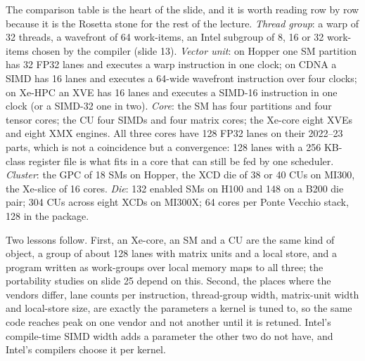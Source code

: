 \documentclass[11pt,letterpaper]{article}
\begin{document}
The comparison table is the heart of the slide, and it is worth reading row by row because it is the Rosetta stone for the rest of the lecture. \emph{Thread group}: a warp of 32 threads, a wavefront of 64 work-items, an Intel subgroup of 8, 16 or 32 work-items chosen by the compiler (slide 13). \emph{Vector unit}: on Hopper one SM partition has 32 FP32 lanes and executes a warp instruction in one clock; on CDNA a SIMD has 16 lanes and executes a 64-wide wavefront instruction over four clocks; on Xe-HPC an XVE has 16 lanes and executes a SIMD-16 instruction in one clock (or a SIMD-32 one in two). \emph{Core}: the SM has four partitions and four tensor cores; the CU four SIMDs and four matrix cores; the Xe-core eight XVEs and eight XMX engines. All three cores have 128 FP32 lanes on their 2022--23 parts, which is not a coincidence but a convergence: 128 lanes with a 256 KB-class register file is what fits in a core that can still be fed by one scheduler. \emph{Cluster}: the GPC of 18 SMs on Hopper, the XCD die of 38 or 40 CUs on MI300, the Xe-slice of 16 cores. \emph{Die}: 132 enabled SMs on H100 and 148 on a B200 die pair; 304 CUs across eight XCDs on MI300X; 64 cores per Ponte Vecchio stack, 128 in the package.

Two lessons follow. First, an Xe-core, an SM and a CU are the same kind of object, a group of about 128 lanes with matrix units and a local store, and a program written as work-groups over local memory maps to all three; the portability studies on slide 25 depend on this. Second, the places where the vendors differ, lane counts per instruction, thread-group width, matrix-unit width and local-store size, are exactly the parameters a kernel is tuned to, so the same code reaches peak on one vendor and not another until it is retuned. Intel's compile-time SIMD width adds a parameter the other two do not have, and Intel's compilers choose it per kernel.
\end{document}
